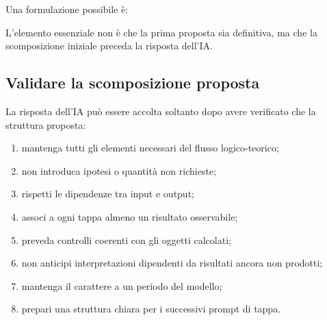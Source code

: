 Una formulazione possibile \`{e}:

\begin{quote}
\small
{}
\end{quote}

L'elemento essenziale non \`{e} che la prima proposta sia definitiva, ma che
la scomposizione iniziale preceda la risposta dell'IA.

\subsection{Validare la scomposizione proposta}

La risposta dell'IA pu\`{o} essere accolta soltanto dopo avere verificato che
la struttura proposta:

\begin{enumerate}
\item mantenga tutti gli elementi necessari del flusso logico-teorico;

\item non introduca ipotesi o quantit\`{a} non richieste;

\item rispetti le dipendenze tra input e output;

\item associ a ogni tappa almeno un risultato osservabile;

\item preveda controlli coerenti con gli oggetti calcolati;

\item non anticipi interpretazioni dipendenti da risultati ancora non
prodotti;

\item mantenga il carattere a un periodo del modello;

\item prepari una struttura chiara per i successivi prompt di tappa.
\end{enumerate}

